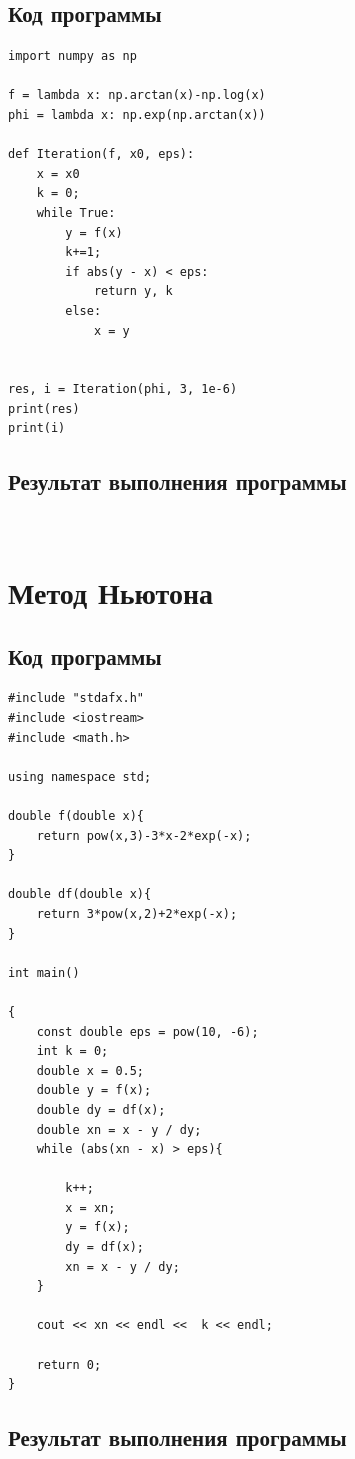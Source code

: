 \documentclass[12pt,a4paper]{article}
\begin{document}
\subsection{Код программы}
\begin{verbatim}
import numpy as np

f = lambda x: np.arctan(x)-np.log(x)
phi = lambda x: np.exp(np.arctan(x))

def Iteration(f, x0, eps):
    x = x0
    k = 0;
    while True:
        y = f(x)
        k+=1;
        if abs(y - x) < eps:
            return y, k
        else:
            x = y


res, i = Iteration(phi, 3, 1e-6)
print(res)
print(i)
\end{verbatim}
\subsection{Результат выполнения программы}\\
\section{Метод Ньютона}
\subsection{Код программы}
\begin{verbatim}
#include "stdafx.h"
#include <iostream>
#include <math.h>

using namespace std;

double f(double x){
	return pow(x,3)-3*x-2*exp(-x);
}

double df(double x){
	return 3*pow(x,2)+2*exp(-x);
}

int main()

{
	const double eps = pow(10, -6);
	int k = 0;
	double x = 0.5;
	double y = f(x);
	double dy = df(x);
	double xn = x - y / dy;
	while (abs(xn - x) > eps){

		k++;
		x = xn;
		y = f(x);
		dy = df(x);
		xn = x - y / dy;
	}

	cout << xn << endl <<  k << endl;

	return 0;
}
\end{verbatim}
\subsection{Результат выполнения программы}\\
\\
\end{document}
